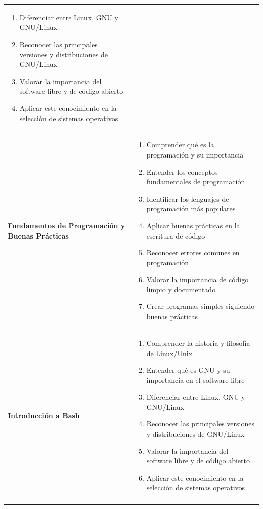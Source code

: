 \documentclass[
  spanish,
  12pt,
  letterpaper,
  DIV=11,
  numbers=noendperiod]{scrreprt}
\providecommand{\tightlist}{%
  \setlength{\itemsep}{0pt}\setlength{\parskip}{0pt}}
\begin{document}
{\begin{longtable}[]{@{}
  >{\raggedright\arraybackslash}p{}
  >{\raggedright\arraybackslash}p{}@{}}
\begin{minipage}[t]{\linewidth}
\begin{enumerate}
\item
  Diferenciar entre Linux, GNU y GNU/Linux
\item
  Reconocer las principales versiones y distribuciones de GNU/Linux
\item
  Valorar la importancia del software libre y de código abierto
\item
  Aplicar este conocimiento en la selección de sistemas operativos
\end{enumerate}
\end{minipage} \\
\textbf{Fundamentos de Programación y Buenas Prácticas} &
\begin{minipage}[t]{\linewidth}\raggedright
\begin{enumerate}
\def\labelenumi{\arabic{enumi}.}
\tightlist
\item
  Comprender qué es la programación y su importancia
\item
  Entender los conceptos fundamentales de programación
\item
  Identificar los lenguajes de programación más populares
\item
  Aplicar buenas prácticas en la escritura de código
\item
  Reconocer errores comunes en programación
\item
  Valorar la importancia de código limpio y documentado
\item
  Crear programas simples siguiendo buenas prácticas
\end{enumerate}
\end{minipage} \\
\textbf{Introducción a Bash} &
\begin{minipage}[t]{\linewidth}\raggedright
\begin{enumerate}
\def\labelenumi{\arabic{enumi}.}
\tightlist
\item
  Comprender la historia y filosofía de Linux/Unix
\item
  Entender qué es GNU y su importancia en el software libre
\item
  Diferenciar entre Linux, GNU y GNU/Linux
\item
  Reconocer las principales versiones y distribuciones de GNU/Linux
\item
  Valorar la importancia del software libre y de código abierto
\item
  Aplicar este conocimiento en la selección de sistemas operativos
\end{enumerate}
\end{minipage} \\
& \\
\end{longtable}
}
\end{document}
